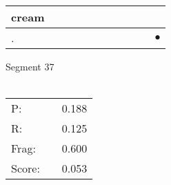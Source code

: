 \documentclass[landscape]{article}
\newcommand{\ssp}{\hspace{2pt}}
\newcommand{\mex}{\cellcolor{g}$\bullet$}
\begin{document}
\begin{tabular}{|l|p{10pt}|p{10pt}|p{10pt}|p{10pt}|p{10pt}|p{10pt}|p{10pt}|p{10pt}|p{10pt}|p{10pt}|}
\hline
\ssp cream \ssp&\hspace{2pt}&\hspace{2pt}&\hspace{2pt}&\hspace{2pt}&\hspace{2pt}&\hspace{2pt}&\hspace{2pt}&\hspace{2pt}&\hspace{2pt}&\hspace{2pt}\\
\hline
\ssp \cellcolor{ref9}. \ssp&\hspace{2pt}&\hspace{2pt}&\hspace{2pt}&\hspace{2pt}&\hspace{2pt}&\hspace{2pt}&\hspace{2pt}&\hspace{2pt}&\hspace{2pt}&\hspace{2pt}\mex\\
\hline
\end{tabular}

\vspace{6pt}
\noindent Segment 37\\\\
\noindent\begin{tabular}{lm{12pt}r}
\hline
P:&&0.188\\
R:&&0.125\\
Frag:&&0.600\\
Score:&&0.053\\
\end{tabular}

\newpage
\end{document}
